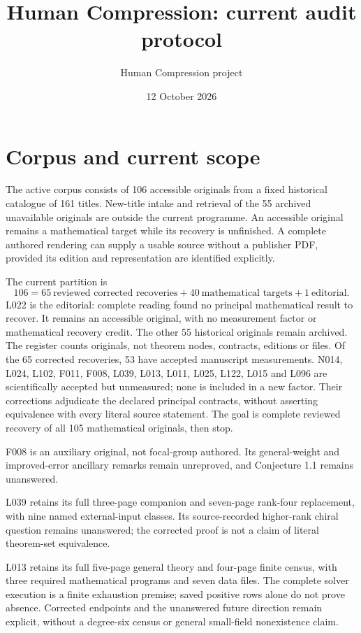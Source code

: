 \documentclass[11pt,a4paper]{article}
\title{Human Compression: current audit protocol}
\author{Human Compression project}
\date{12 October 2026}
\begin{document}
\maketitle

\section{Corpus and current scope}

The active corpus consists of 106 accessible originals from a fixed historical
catalogue of 161 titles. New-title intake and retrieval of the 55 archived
unavailable originals are outside the current programme. An accessible original
remains a mathematical target while its recovery is unfinished. A complete
authored rendering can supply a usable source without a publisher PDF, provided
its edition and representation are identified explicitly.

The current partition is
\[
106=65\ \text{reviewed corrected recoveries}+40\ \text{mathematical targets}
       +1\ \text{editorial}.
\]
L022 is the editorial: complete reading found no principal mathematical result
to recover. It remains an accessible original, with no measurement factor or
mathematical recovery credit. The other 55 historical originals remain archived.
The register counts originals, not theorem nodes, contracts, editions or files.
Of the 65 corrected recoveries, 53 have accepted manuscript measurements.
N014, L024, L102, F011, F008, L039, L013, L011, L025, L122, L015 and L096 are scientifically accepted but unmeasured; none is included
in a new factor. Their corrections adjudicate the declared principal contracts,
without asserting equivalence with every literal source statement. The goal
is complete reviewed recovery of all 105 mathematical originals, then stop.

F008 is an auxiliary original, not focal-group authored. Its general-weight and
improved-error ancillary remarks remain unreproved, and Conjecture 1.1 remains
unanswered.

L039 retains its full three-page companion and seven-page rank-four replacement,
with nine named external-input classes. Its source-recorded higher-rank chiral
question remains unanswered; the corrected proof is not a claim of literal
theorem-set equivalence.

L013 retains its full five-page general theory and four-page finite census,
with three required mathematical programs and seven data files. The complete
solver execution is a finite exhaustion premise; saved positive rows alone do
not prove absence. Corrected endpoints and the unanswered future direction
remain explicit, without a degree-six census or general small-field nonexistence
claim.
\end{document}
